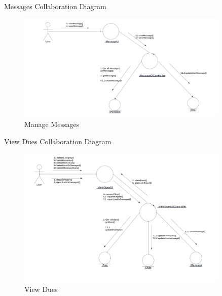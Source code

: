 \documentclass[20pt]{beamer}
\numberwithin{figure}{section}
\begin{document}
\begin{frame}{Messages Collaboration Diagram}

     \begin{figure}
        \centering
        \includegraphics[width= 0.9\textwidth , height= 0.4\paperheight]{MessagesCollab.png}
        \caption{Manage Messages}
        \label{fig:24}
    \end{figure}

\end{frame}

\begin{frame}{View Dues Collaboration Diagram}

     \begin{figure}
        \centering
        \includegraphics[width= 0.9\textwidth , height= 0.6\paperheight]{ViewDuesCollab.png}
        \caption{View Dues}
        \label{fig:25}
    \end{figure}

\end{frame}
\end{document}
